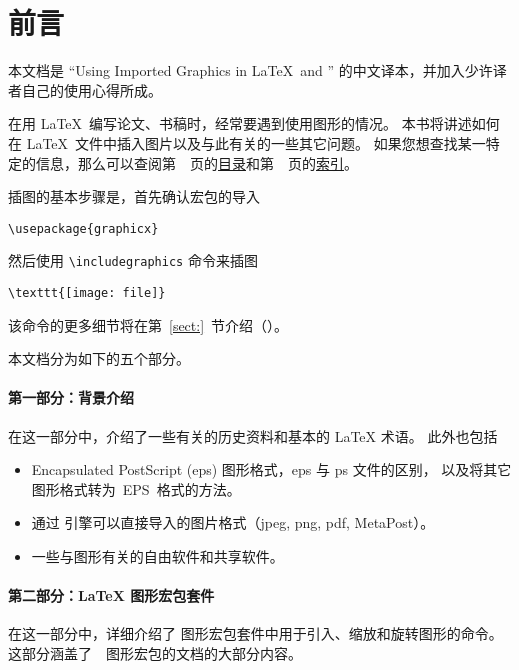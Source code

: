 \section*{前言}
\label{sect:preface}

本文档是 ``Using Imported Graphics in \LaTeX\ and \pdfLaTeX'' 的中文译本，并加入少许译者自己的使用心得所成。

在用 \LaTeX\ 编写论文、书稿时，经常要遇到使用图形的情况。
本书将讲述如何在 \LaTeX\ 文件中插入图片以及与此有关的一些其它问题。
如果您想查找某一特定的信息，那么可以查阅第~\pageref{toc}~页的\hyperref[toc]{目录}和第~\pageref{sec:index}~页的\hyperref[sec:index]{索引}。

插图的基本步骤是，首先确认宏包的导入
\begin{Verbatim}
\usepackage{graphicx}
\end{Verbatim}
然后使用 \verb|\includegraphics| 命令来插图
\begin{Verbatim}
\texttt{[image: file]}
\end{Verbatim}
该命令的更多细节将在第~\ref{sect:}~节介绍（\pageref{sect:}）。

本文档分为如下的五个部分。

\paragraph{第一部分：背景介绍}
在这一部分中，介绍了一些有关的历史资料和基本的 \LaTeX{} 术语。
此外也包括
\begin{itemize}
	\item Encapsulated PostScript (eps) 图形格式，eps 与 ps 文件的区别，
	以及将其它图形格式转为~EPS~格式的方法。
	\item 通过 \pdfTeX 引擎可以直接导入的图片格式（jpeg, png, pdf, MetaPost）。
	\item 一些与图形有关的自由软件和共享软件。
\end{itemize}

\paragraph{第二部分：\LaTeX{} 图形宏包套件}
在这一部分中，详细介绍了 \LaTeXe{} 图形宏包套件中用于引入、缩放和旋转图形的命令。
这部分涵盖了~\LaTeXe{}~图形宏包的文档的大部分内容\cite{grfguide}。

